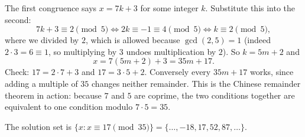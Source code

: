 The first congruence says $x=7k+3$ for some integer $k$. Substitute this into the second:
\[
7k+3\equiv2\pmod5\iff 2k\equiv-1\equiv4\pmod5\iff k\equiv2\pmod5 ,
\]
where we divided by $2$, which is allowed because $\gcd(2,5)=1$ (indeed $2\cdot3=6\equiv1$, so multiplying by $3$ undoes multiplication by $2$). So $k=5m+2$ and
\[
x=7(5m+2)+3=35m+17 .
\]
Check: $17=2\cdot7+3$ and $17=3\cdot5+2$. Conversely every $35m+17$ works, since adding a multiple of $35$ changes neither remainder. This is the Chinese remainder theorem in action: because $7$ and $5$ are coprime, the two conditions together are equivalent to one condition modulo $7\cdot5=35$.

The solution set is $\boxed{\{x: x\equiv17\pmod{35}\}=\{\dots,-18,17,52,87,\dots\}}$.
